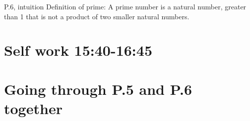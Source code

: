 \documentclass[10pt,danish,t,10pt]{beamer}
\begin{document}
\begin{frame}{P.6, intuition}
Definition of prime: A prime number is a
natural number, greater than 1 that is not a product of two smaller natural numbers.
\end{frame}
\section{Self work 15:40-16:45}
\section{Going through P.5 and P.6 together}
\end{document}
